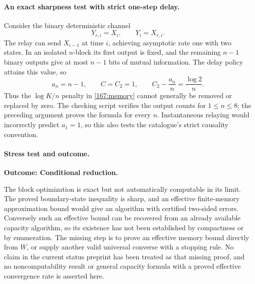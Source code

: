 \documentclass[11pt,a4paper]{article}
\numberwithin{equation}{section}
\begin{document}
\paragraph{An exact sharpness test with strict one-step delay.}
Consider the binary deterministic channel
\begin{equation}
 Y_{r,i}=X_i,\qquad Y_i=X_{r,i}.
\end{equation}
The relay can send $X_{i-1}$ at time $i$, achieving asymptotic rate one
with two states. In an isolated $n$-block its first output is fixed,
and the remaining $n-1$ binary outputs give at most $n-1$ bits of mutual
information. The delay policy attains this value, so
\begin{equation}
 a_n=n-1,\qquad C=C_2=1,
 \qquad C_2-\frac{a_n}{n}=\frac{\log2}{n}.
\end{equation}
Thus the $\log K/n$ penalty in \eqref{167:memory} cannot generally be
removed or replaced by zero. The checking script verifies the output
counts for $1\leq n\leq8$; the preceding argument proves the formula
for every $n$. Instantaneous relaying would incorrectly predict
$a_1=1$, so this also tests the catalogue's strict causality convention.

\paragraph{Stress test and outcome.}
\textbf{Outcome: Conditional reduction.}

The block optimization is exact but not automatically computable in
its limit. The proved boundary-state inequality is sharp, and an
effective finite-memory approximation bound would give an algorithm
with certified two-sided errors. Conversely such an effective bound
can be recovered from an already available capacity algorithm, so its
existence has not been established by compactness or by enumeration.
The missing step is to prove an effective memory bound directly from
$W$, or supply another valid universal converse with a stopping rule.
No claim in the current status preprint has been treated as that missing
proof, and no noncomputability result or general capacity formula with
a proved effective convergence rate is asserted here.
\end{document}
